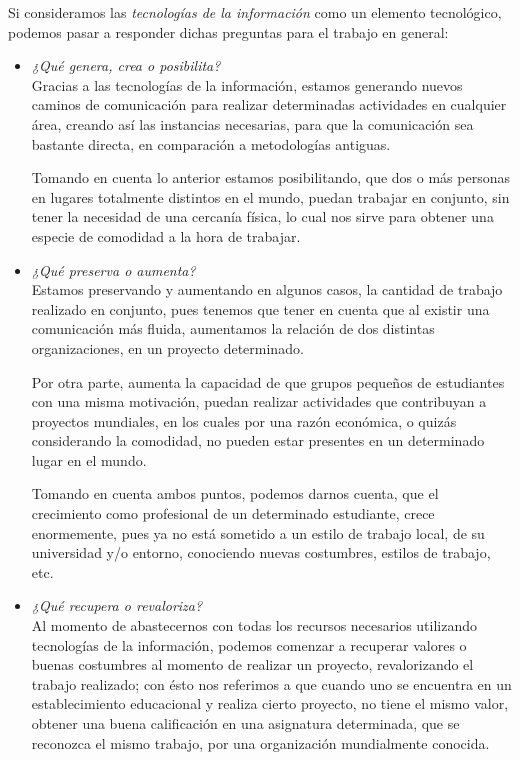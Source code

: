 Si consideramos las \emph{tecnologías de la información} como un elemento tecnológico, podemos pasar a responder dichas preguntas para el trabajo en general:
\begin{itemize}
	\item \emph{¿Qué genera, crea o posibilita?}\\
		Gracias a las tecnologías de la información, estamos generando nuevos caminos de comunicación para realizar determinadas actividades en cualquier área,
		creando así las instancias necesarias, para que la comunicación sea bastante directa, en comparación a metodologías antiguas.
		
		Tomando en cuenta lo anterior estamos posibilitando, que dos o más personas en lugares totalmente distintos en el mundo, puedan trabajar en conjunto,
		sin tener la necesidad de una cercanía física, lo cual nos sirve para obtener una especie de comodidad a la hora de trabajar.
		
	\item \emph{¿Qué preserva o aumenta?}\\
		Estamos preservando y aumentando en algunos casos, la cantidad de trabajo realizado en conjunto, pues tenemos que tener en cuenta que al existir una
		comunicación más fluida, aumentamos la relación de dos distintas organizaciones, en un proyecto determinado.

		Por otra parte, aumenta la capacidad de que grupos pequeños de estudiantes con una misma motivación, puedan realizar actividades que contribuyan
		a proyectos mundiales, en los cuales por una razón económica, o quizás considerando la comodidad, no pueden estar presentes en un determinado lugar
		en el mundo.
	
		Tomando en cuenta ambos puntos, podemos darnos cuenta, que el crecimiento como profesional de un determinado estudiante, crece enormemente,
		pues ya no está sometido a un estilo de trabajo local, de su universidad y/o entorno, conociendo nuevas costumbres, estilos de trabajo, etc.

 	\item \emph{¿Qué recupera o revaloriza?}\\
		Al momento de abastecernos con todas los recursos necesarios utilizando tecnologías de la información, podemos comenzar a recuperar valores o 
		buenas costumbres al momento de realizar un proyecto, revalorizando el trabajo realizado; con ésto nos referimos a que cuando uno se encuentra
		en un establecimiento educacional y realiza cierto proyecto, no tiene el mismo valor, obtener una buena calificación en una asignatura determinada,
		que se reconozca el mismo trabajo, por una organización mundialmente conocida.


\end{itemize}
